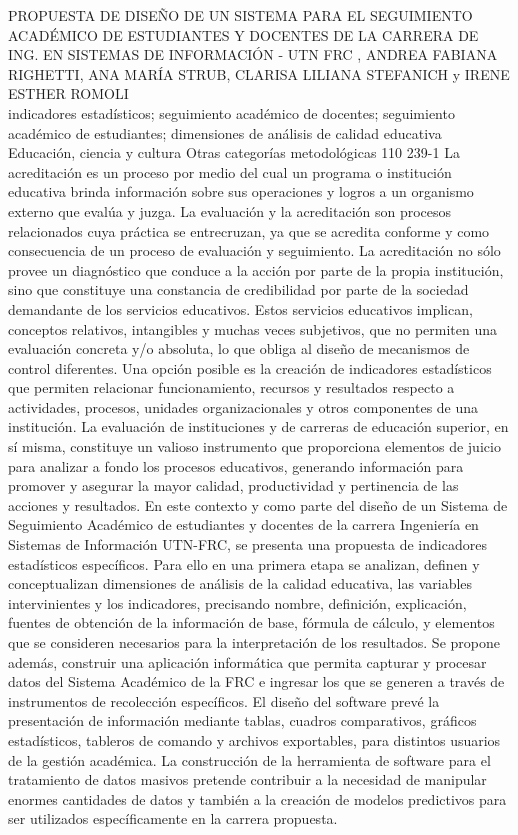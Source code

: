 \A
{PROPUESTA DE DISEÑO DE UN SISTEMA PARA EL SEGUIMIENTO ACADÉMICO DE ESTUDIANTES Y DOCENTES DE LA CARRERA DE ING. EN SISTEMAS DE INFORMACIÓN - UTN FRC}
{, ANDREA FABIANA RIGHETTI, ANA MARÍA STRUB, CLARISA LILIANA STEFANICH y IRENE ESTHER ROMOLI}
{
\\}
{indicadores estadísticos; seguimiento académico de docentes; seguimiento académico de estudiantes; dimensiones de análisis de calidad educativa} 
 {Educación, ciencia y cultura} 
 {Otras categorías metodológicas} 
 {110} 
 {239-1}
{La acreditación es un proceso por medio del cual un programa o institución educativa brinda información sobre sus operaciones y logros a un organismo externo que evalúa y juzga. La evaluación y la acreditación son procesos relacionados cuya práctica se entrecruzan, ya que se acredita conforme y como consecuencia de un proceso de evaluación y seguimiento. La acreditación no sólo provee un diagnóstico que conduce a la acción por parte de la propia institución, sino que constituye una constancia de credibilidad por parte de la sociedad demandante de los servicios educativos. Estos servicios educativos implican, conceptos relativos, intangibles y muchas veces subjetivos, que no permiten una evaluación concreta y/o absoluta, lo que obliga al diseño de mecanismos de control diferentes. Una opción posible es la creación de indicadores estadísticos que permiten relacionar funcionamiento, recursos y resultados respecto a actividades, procesos, unidades organizacionales y otros componentes de una institución. La evaluación de instituciones y de carreras de educación superior, en sí misma, constituye un valioso instrumento que proporciona elementos de juicio para analizar a fondo los procesos educativos, generando información para promover y asegurar la mayor calidad, productividad y pertinencia de las acciones y resultados. En este contexto y como parte del diseño de un Sistema de Seguimiento Académico de estudiantes y docentes de la carrera Ingeniería en Sistemas de Información UTN-FRC, se presenta una propuesta de indicadores estadísticos específicos. Para ello en una primera etapa se analizan, definen y conceptualizan dimensiones de análisis de la calidad educativa, las variables intervinientes y los indicadores, precisando nombre, definición, explicación, fuentes de obtención de la información de base, fórmula de cálculo, y elementos que se consideren necesarios para la interpretación de los resultados. Se propone además, construir una aplicación informática que permita capturar y procesar datos del Sistema Académico de la FRC e ingresar los que se generen a través de instrumentos de recolección específicos. El diseño del software prevé la presentación de información mediante tablas, cuadros comparativos, gráficos estadísticos, tableros de comando y archivos exportables, para distintos usuarios de la gestión académica. La construcción de la herramienta de software para el tratamiento de datos masivos pretende contribuir a la necesidad de manipular enormes cantidades de datos y también a la creación de modelos predictivos para ser utilizados específicamente en la carrera propuesta.}
